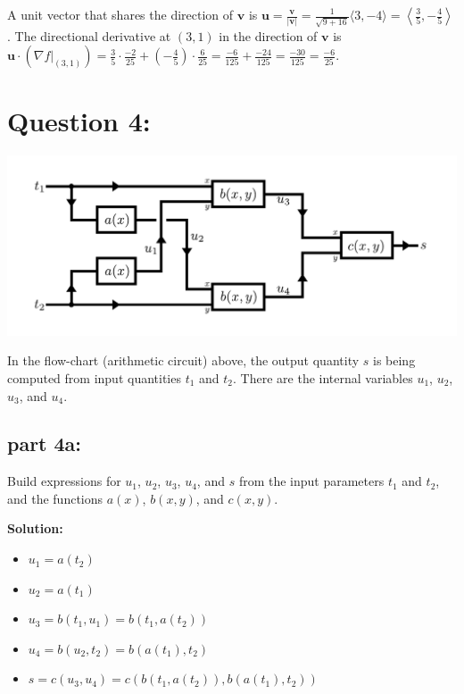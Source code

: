 \documentclass{article}
\newcommand{\abs}[1]{\left|#1\right|}
\newcommand{\at}[1]{\left. #1 \right|}
\newcommand{\dr}[1]{\textcolor{dark_red}{#1}}
\begin{document}
\dr{A unit vector that shares the direction of \(\mathbf{v}\) is \(\mathbf{u} = \frac{\mathbf{v}}{\abs{\mathbf{v}}} = \frac{1}{\sqrt{9 + 16}}\langle 3, -4 \rangle = \left\langle \frac{3}{5}, -\frac{4}{5} \right\rangle\). The directional derivative at \((3, 1)\) in the direction of \(\mathbf{v}\) is \(\mathbf{u} \cdot (\at{\nabla f}_{(3,1)}) = \frac{3}{5}\cdot\frac{-2}{25} + (-\frac{4}{5})\cdot\frac{6}{25} = \frac{-6}{125} + \frac{-24}{125} = \frac{-30}{125} = \frac{-6}{25}\).}



\section*{Question 4:}

\begin{center}
\includegraphics[width = \textwidth]{chain_rule_XOR_circuit}
\end{center}

In the flow-chart (arithmetic circuit) above, the output quantity \(s\) is being computed from input quantities \(t_1\) and \(t_2\). There are the internal variables \(u_1\), \(u_2\), \(u_3\), and \(u_4\).

\subsection*{part 4a:}

Build expressions for \(u_1\), \(u_2\), \(u_3\), \(u_4\), and \(s\) from the input parameters \(t_1\) and \(t_2\), and the functions \(a(x)\), \(b(x,y)\), and \(c(x,y)\).

\vspace{0.5cm}

\dr{\bf Solution:}

\dr{\begin{itemize}
\item \(u_1 = a(t_2)\)
\item \(u_2 = a(t_1)\) 
\item \(u_3 = b(t_1,u_1) = b(t_1,a(t_2))\)
\item \(u_4 = b(u_2,t_2) = b(a(t_1),t_2)\)
\item \(s = c(u_3,u_4) = c(b(t_1,a(t_2)),b(a(t_1),t_2))\)
\end{itemize}}
\end{document}
